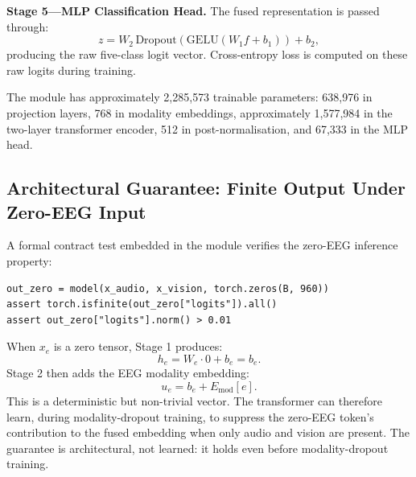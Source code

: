 \textbf{Stage 5---MLP Classification Head.} The fused representation is passed through:
\begin{equation}
    z = W_2\,\mathrm{Dropout}\left(\mathrm{GELU}(W_1 f + b_1)\right) + b_2,
\end{equation}
producing the raw five-class logit vector. Cross-entropy loss is computed on these raw logits during training.

The module has approximately 2,285,573 trainable parameters: 638,976 in projection layers, 768 in modality embeddings, approximately 1,577,984 in the two-layer transformer encoder, 512 in post-normalisation, and 67,333 in the MLP head.

\subsection{Architectural Guarantee: Finite Output Under Zero-EEG Input}
A formal contract test embedded in the module verifies the zero-EEG inference property:

\begin{verbatim}
out_zero = model(x_audio, x_vision, torch.zeros(B, 960))
assert torch.isfinite(out_zero["logits"]).all()
assert out_zero["logits"].norm() > 0.01
\end{verbatim}

When $x_e$ is a zero tensor, Stage 1 produces:
\begin{equation}
    h_e = W_e\cdot 0 + b_e = b_e.
\end{equation}
Stage 2 then adds the EEG modality embedding:
\begin{equation}
    u_e = b_e + E_{\mathrm{mod}}[e].
\end{equation}
This is a deterministic but non-trivial vector. The transformer can therefore learn, during modality-dropout training, to suppress the zero-EEG token's contribution to the fused embedding when only audio and vision are present. The guarantee is architectural, not learned: it holds even before modality-dropout training.

